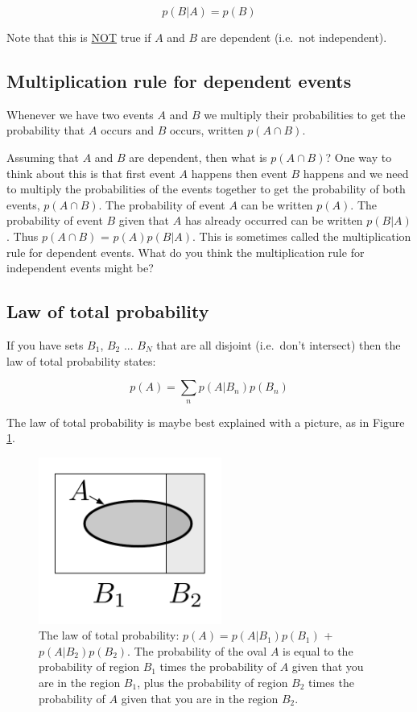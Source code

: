 \documentclass[]{article}
\theoremstyle{definition}
\begin{document}
\begin{equation}
p(B|A) = p(B)
\end{equation}

Note that this is \underline{NOT} true if $A$ and $B$ are dependent (i.e.\ not independent).

\subsection{Multiplication rule for dependent events}

Whenever we have two events $A$ and $B$ we multiply their probabilities to get the probability that $A$ occurs and $B$ occurs, written $p(A \cap B)$. 

Assuming that $A$ and $B$ are dependent, then what is $p(A \cap B)$? One way to think about this is that first event $A$ happens then event $B$ happens and we need to multiply the probabilities of the events together to get the probability of both events, $p(A \cap B)$. The probability of event $A$ can be written $p(A)$. The probability of event $B$ given that $A$ has already occurred can be written $p(B \vert A)$. Thus $p(A \cap B)$ = $p(A)p(B \vert A)$. This is sometimes called the multiplication rule for dependent events. What do you think the multiplication rule for independent events might be?


\subsection{Law of total probability}

If you have sets $B_1$, $B_2$ ... $B_N$ that are all disjoint (i.e.\ don't intersect) then the law of total probability states: 

\[p(A) = \sum\limits_{n} p(A|B_n)p(B_n)\]

The law of total probability is maybe best explained with a picture, as in Figure \ref{f:total_prob}.

\begin{figure}[!ht]
     \centering
     \includegraphics[width=6cm]{total_probability}
     \caption{The law of total probability: $p(A) = p(A|B_1)p(B_1)$ + $p(A|B_2)p(B_2)$. The probability of the oval $A$ is equal to the probability of region $B_1$ times the probability of $A$ given that you are in the region $B_1$, plus the probability of region $B_2$ times the probability of $A$ given that you are in the region $B_2$. }\label{f:total_prob}
\end{figure}
\end{document}
